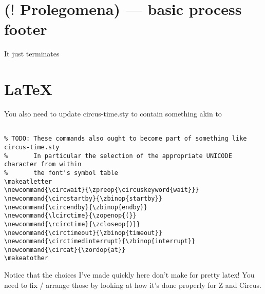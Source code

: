 \documentclass{article}
\newcommand{\circwait}{\zpreop{\circuskeyword{wait}}}
\newcommand{\circstartby}{\zbinop{startby}}
\newcommand{\circendby}{\zbinop{endby}}
\newcommand{\lcirctime}{\zopenop{(}}
\newcommand{\rcirctime}{\zcloseop{)}}
\newcommand{\circtimeout}{\zbinop{timeout}}
\newcommand{\circtimedinterrupt}{\zbinop{interrupt}}
\newcommand{\circat}{\zordop{at}}
\begin{document}
\newpage
\section{($!$ Prolegomena) --- basic process footer}

It just terminates

\begin{circusaction}
   \circspot \Skip
\end{circusaction}

\begin{circus}
   \circend
\end{circus}

\newpage
\section{\LaTeX}

You also need to update \textsf{circus-time.sty} to contain something akin to

\begin{verbatim}

% TODO: These commands also ought to become part of something like circus-time.sty
% 		In particular the selection of the appropriate UNICODE character from within
%		the font's symbol table
\makeatletter
\newcommand{\circwait}{\zpreop{\circuskeyword{wait}}}
\newcommand{\circstartby}{\zbinop{startby}} 
\newcommand{\circendby}{\zbinop{endby}} 
\newcommand{\lcirctime}{\zopenop{(}} 
\newcommand{\rcirctime}{\zcloseop{)}} 
\newcommand{\circtimeout}{\zbinop{timeout}}
\newcommand{\circtimedinterrupt}{\zbinop{interrupt}}
\newcommand{\circat}{\zordop{at}}
\makeatother

\end{verbatim}

Notice that the choices I've made quickly here don't make for pretty latex! You need to fix / arrange those
by looking at how it's done properly for Z and Circus.
\end{document}
